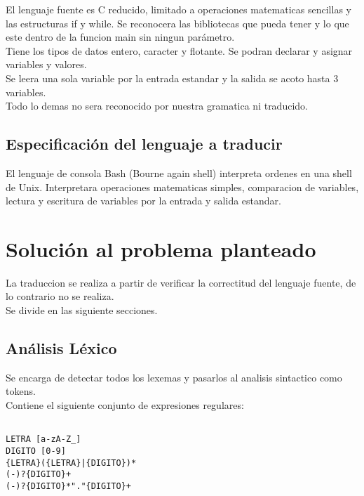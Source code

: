 \documentclass[aspectratio=169]{article}
\begin{document}
	El lenguaje fuente es C reducido, limitado a operaciones matematicas sencillas y las estructuras
	if y while. Se reconocera las bibliotecas que pueda tener y lo que este dentro de la funcion
	main sin ningun par\'ametro. \\

	Tiene los tipos de datos entero, caracter y flotante. Se podran declarar y asignar variables y valores.\\

	Se leera una sola variable por la entrada estandar y la salida se acoto hasta 3 variables. \\

	Todo lo demas no sera reconocido por nuestra gramatica ni traducido.

\subsection{Especificaci\'on del lenguaje a traducir}

El lenguaje de consola Bash (Bourne again shell) interpreta ordenes en una shell de Unix.
Interpretara operaciones matematicas simples, comparacion de variables, lectura y escritura de variables
por la entrada y salida estandar.

\section{Soluci\'on al problema planteado}

La traduccion se realiza a partir de verificar la correctitud del lenguaje fuente, de lo contrario
no se realiza.\\

Se divide en las siguiente secciones.

\subsection{An\'alisis L\'exico}

Se encarga de detectar todos los lexemas y pasarlos al analisis sintactico como tokens.\\
Contiene el siguiente conjunto de expresiones regulares:\\

\begin{lstlisting}

LETRA [a-zA-Z_]
DIGITO [0-9]
{LETRA}({LETRA}|{DIGITO})*
(-)?{DIGITO}+
(-)?{DIGITO}*"."{DIGITO}+

\end{lstlisting}
\end{document}
